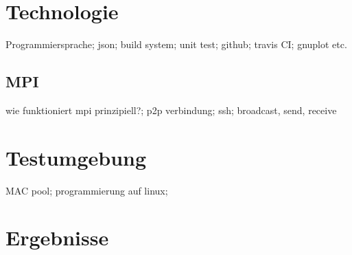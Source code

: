 \documentclass[12pt,a4paper]{scrreprt}
\begin{document}
\chapter{Technologie}
\label{chap:technologie}

Programmiersprache; json; build system; unit test; github; travis CI; gnuplot etc.

\section{MPI}
\label{sec:mpi}

wie funktioniert mpi prinzipiell?; p2p verbindung; ssh; broadcast, send, receive 

\chapter{Testumgebung}
\label{chap:testumgebung}

MAC pool; programmierung auf linux;

\chapter{Ergebnisse}
\label{chap:ergebnisse}

\clearpage
{}
\lstlistoflistings
{}
\listoffigures
\listoftables


\end{document}
